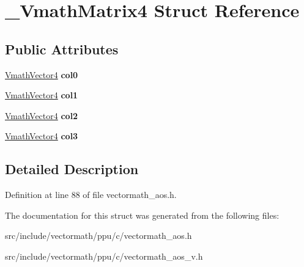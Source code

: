 \hypertarget{struct__VmathMatrix4}{\section{\-\_\-\-Vmath\-Matrix4 Struct Reference}
\label{struct__VmathMatrix4}
}
\subsection*{Public Attributes}
\begin{DoxyCompactItemize}
\item 
\hypertarget{struct__VmathMatrix4_a898c8e6a41a14c1653a1ac0e12a16676}{\hyperlink{struct__VmathVector4}{Vmath\-Vector4} {\bfseries col0}}\label{struct__VmathMatrix4_a898c8e6a41a14c1653a1ac0e12a16676}

\item 
\hypertarget{struct__VmathMatrix4_ac36ca6eb47ecd42a5cf52f8ce3b54d66}{\hyperlink{struct__VmathVector4}{Vmath\-Vector4} {\bfseries col1}}\label{struct__VmathMatrix4_ac36ca6eb47ecd42a5cf52f8ce3b54d66}

\item 
\hypertarget{struct__VmathMatrix4_a095d91a32becd0c538a1703d92597317}{\hyperlink{struct__VmathVector4}{Vmath\-Vector4} {\bfseries col2}}\label{struct__VmathMatrix4_a095d91a32becd0c538a1703d92597317}

\item 
\hypertarget{struct__VmathMatrix4_a89ccade95d66e0a958ac0aaab43664f5}{\hyperlink{struct__VmathVector4}{Vmath\-Vector4} {\bfseries col3}}\label{struct__VmathMatrix4_a89ccade95d66e0a958ac0aaab43664f5}

\end{DoxyCompactItemize}


\subsection{Detailed Description}


Definition at line 88 of file vectormath\-\_\-aos.\-h.



The documentation for this struct was generated from the following files\-:\begin{DoxyCompactItemize}
\item 
src/include/vectormath/ppu/c/vectormath\-\_\-aos.\-h\item 
src/include/vectormath/ppu/c/vectormath\-\_\-aos\-\_\-v.\-h\end{DoxyCompactItemize}
